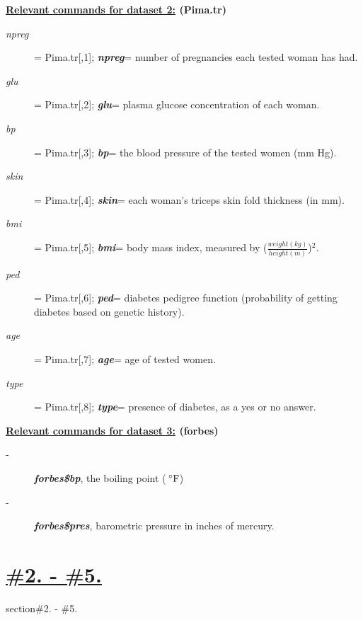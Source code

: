 \documentclass[12pt,a4paper]{article}
\begin{document}
\begin{center}{\textbf{\underline{Relevant commands for dataset 2:} (Pima.tr)}}\end{center}
\begin{description}

\item[\textit{npreg}]= Pima.tr[,1]; \textbf{\textit{npreg}}= number of pregnancies each tested woman has had.
\item[\textit{glu}]= Pima.tr[,2]; \textbf{\textit{glu}}= plasma glucose concentration of each woman.
\item[\textit{bp}]= Pima.tr[,3]; \textbf{\textit{bp}}= the blood pressure of the tested women (mm Hg).
\item[\textit{skin}]= Pima.tr[,4]; \textbf{\textit{skin}}= each woman's triceps skin fold thickness (in mm).
\item[\textit{bmi}]= Pima.tr[,5]; \textbf{\textit{bmi}}= body mass index, measured by {\color{MidnightBlue}($\frac{weight(kg)}{height(m)}$)\begin{math}^2\end{math}}.
\item[\textit{ped}]= Pima.tr[,6]; \textbf{\textit{ped}}= diabetes pedigree function (probability of getting diabetes based on genetic history).
\item[\textit{age}]= Pima.tr[,7]; \textbf{\textit{age}}= age of tested women.
\item[\textit{type}]= Pima.tr[,8]; \textbf{\textit{type}}= presence of diabetes, as a yes or no answer.
\end{description}
\vspace{1cm}
\begin{center}{\textbf{\underline{Relevant commands for dataset 3:} (forbes)}}\end{center}
\begin{description}

\item[-] \textbf{\textit{forbes\$bp}}, the boiling point ({$\,^{\circ}\rm{F}$})
\item[-] \textbf{\textit{forbes\$pres}}, barometric pressure in inches of mercury.
\end{description}

\tableofcontents
\label{label:BTP}

\section*{\textbf{\underline{\#2. - \#5.}}}
{section}{{\#2. - \#5.}}
\end{document}
